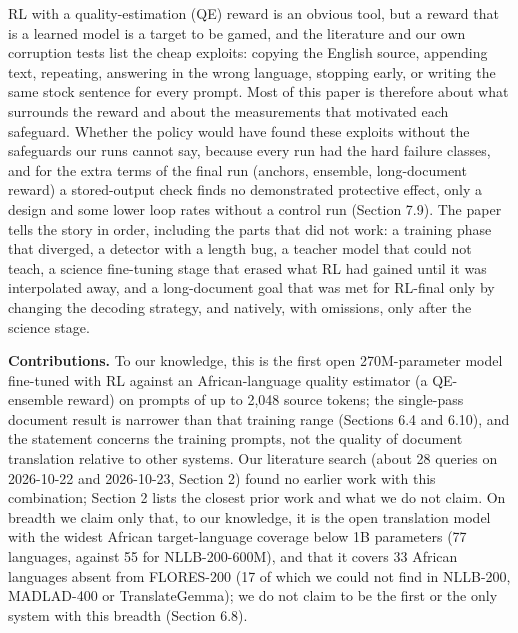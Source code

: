 RL with a quality-estimation (QE) reward is an obvious tool, but a reward that is a learned model is a target to be gamed, and the literature and our own corruption tests list the cheap exploits: copying the English source, appending text, repeating, answering in the wrong language, stopping early, or writing the same stock sentence for every prompt. Most of this paper is therefore about what surrounds the reward and about the measurements that motivated each safeguard. Whether the policy would have found these exploits without the safeguards our runs cannot say, because every run had the hard failure classes, and for the extra terms of the final run (anchors, ensemble, long-document reward) a stored-output check finds no demonstrated protective effect, only a design and some lower loop rates without a control run (Section 7.9). The paper tells the story in order, including the parts that did not work: a training phase that diverged, a detector with a length bug, a teacher model that could not teach, a science fine-tuning stage that erased what RL had gained until it was interpolated away, and a long-document goal that was met for RL-final only by changing the decoding strategy, and natively, with omissions, only after the science stage.

\textbf{Contributions.} To our knowledge, this is the first open 270M-parameter model fine-tuned with RL against an African-language quality estimator (a QE-ensemble reward) on prompts of up to 2,048 source tokens; the single-pass document result is narrower than that training range (Sections 6.4 and 6.10), and the statement concerns the training prompts, not the quality of document translation relative to other systems. Our literature search (about 28 queries on 2026-10-22 and 2026-10-23, Section 2) found no earlier work with this combination; Section 2 lists the closest prior work and what we do not claim. On breadth we claim only that, to our knowledge, it is the open translation model with the widest African target-language coverage below 1B parameters (77 languages, against 55 for NLLB-200-600M), and that it covers 33 African languages absent from FLORES-200 (17 of which we could not find in NLLB-200, MADLAD-400 or TranslateGemma); we do not claim to be the first or the only system with this breadth (Section 6.8).

